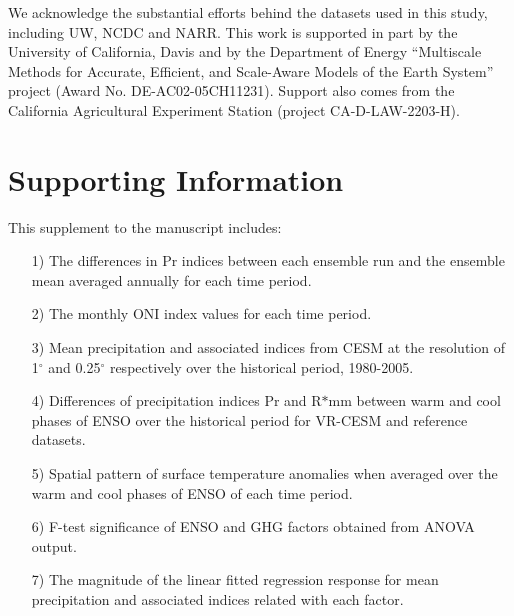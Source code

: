We acknowledge the substantial efforts behind the datasets used in this study, including UW, NCDC and NARR. This work is supported in part by the University of California, Davis and by the Department of Energy ``Multiscale Methods for Accurate, Efficient, and Scale-Aware Models of the Earth System'' project (Award No. DE-AC02-05CH11231). Support also comes from the California Agricultural Experiment Station (project CA-D-LAW-2203-H). 

\section{Supporting Information}

This supplement to the manuscript includes:

\begin{itemize}

\item[1)] The differences in Pr indices between each ensemble run and the ensemble mean averaged annually for each time period.

\item[2)] The monthly ONI index values for each time period.

\item[3)] Mean precipitation and associated indices from CESM at the resolution of 1$^\circ$ and 0.25$^\circ$ respectively over the historical period, 1980-2005.

\item[4)] Differences of precipitation indices Pr and R$\ast$mm between warm and cool phases of ENSO over the historical period for VR-CESM and reference datasets.

\item[5)] Spatial pattern of surface temperature anomalies when averaged over the warm and cool phases of ENSO of each time period.

\item[6)] F-test significance of ENSO and GHG factors obtained from ANOVA output.

\item[7)] The magnitude of the linear fitted regression response for mean precipitation and associated indices related with each factor.

\end{itemize}


